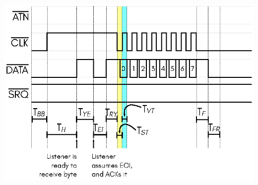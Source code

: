 \begin{center}
\includegraphics{images/IEC-Timing-Diagrams/IEC-Timing-Diagram-Send-Byte-EOI}
\end{center}

